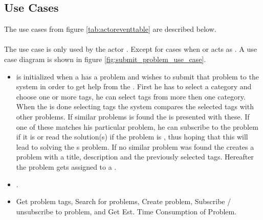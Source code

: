 \subsection{Use Cases}
\label{sec:usecase}

The use cases from figure \ref{tab:actoreventtable} are described below.  

\paragraph{\ucsproblem[c]} The use case \ucsproblem[] is only used by the actor \aclient. Except for cases when \astaff{} or \sadmin{}  acts as \aclient{}. A use case diagram is shown in figure \ref{fig:submit_problem_use_case}. 
\begin{itemize}
\item {} \ucsproblem[c] is initialized when a \aclient{} has a problem and wishes to submit that problem to the system in order to get help from the \astaff{}. 
First he has to select a category and choose one or more tags, he can select tags from more then one category. 
When the \aclient{} is done selecting tags the system compares the selected tags with other problems. 
If similar problems is found the \aclient{} is presented with these.
If one of these matches his particular problem, he can subscribe to the problem if it is \open[] or read the solution(s) if the problem is \closed{}, thus hoping that this will lead to solving the \aclient s problem.
If no similar problem was found the \aclient{} creates a problem with a title, description and the previously selected tags. 
Hereafter the problem gets assigned to a \astaff{}. 

\item {} .

\item {} Get problem tags, Search for problems, Create problem, Subscribe / unsubscribe to problem, and Get Est. Time Consumption of Problem. 
\end{itemize}

